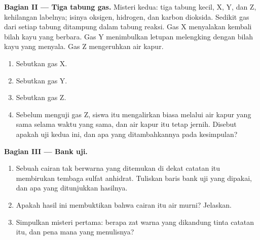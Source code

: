 \begin{problem}
\medskip
\noindent\textbf{Bagian II --- Tiga tabung gas.}
Misteri kedua: tiga tabung kecil, X, Y, dan Z, kehilangan labelnya;
isinya oksigen, hidrogen, dan karbon dioksida. Sedikit gas dari setiap
tabung ditampung dalam tabung reaksi. Gas X menyalakan kembali bilah
kayu yang berbara. Gas Y menimbulkan letupan melengking dengan bilah
kayu yang menyala. Gas Z mengeruhkan air kapur.
\begin{enumerate}[resume]
  \item Sebutkan gas X.
  \item Sebutkan gas Y.
  \item Sebutkan gas Z.
  \item Sebelum menguji gas Z, siswa itu mengalirkan  biasa melalui
        air kapur yang sama selama waktu yang sama, dan air kapur itu
        tetap jernih. Disebut apakah uji kedua ini, dan apa yang
        ditambahkannya pada kesimpulan?
\end{enumerate}

\medskip
\noindent\textbf{Bagian III --- Bank uji.}
\begin{enumerate}[resume]
  \item Sebuah cairan tak berwarna yang ditemukan di dekat catatan itu
        membirukan tembaga sulfat anhidrat. Tuliskan baris bank uji yang
        dipakai, dan apa yang ditunjukkan hasilnya.
  \item Apakah hasil ini membuktikan bahwa cairan itu air murni?
        Jelaskan.
  \item Simpulkan misteri pertama: berapa zat warna yang dikandung tinta
        catatan itu, dan pena mana yang menulisnya?
\end{enumerate}
\end{problem}
